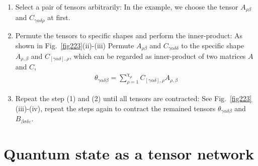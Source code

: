 \begin{enumerate}

	\item Select a pair of tensors arbitrarily: In the example, we choose the tensor $A_{\rho \beta}$ and $C_{\gamma \alpha \delta \rho}$ at first. 
	\item Permute the tensors to specific shapes and perform the inner-product: As shown in Fig.~\ref{fig223}(ii)-(iii) Permute $A_{\rho \beta}$ and $C_{\gamma \alpha \delta \delta}$ to the specific shape $A_{\rho, \beta}$ and $C_{[\gamma \alpha \delta], \rho}$, which can be regarded as inner-product of two matrices $A$ and $C$, 
		\begin{align}
			\theta_{\gamma \alpha \delta \beta} = \sum_{\rho = 1}^{\chi_{\rho}}{C_{[\gamma \alpha \delta], \rho} A_{\rho, \beta}}
		\end{align}
	\item Repeat the step (1) and (2) until all tensors are contracted: See Fig.~\ref{fig223}(iii)-(iv), repeat the steps again to contract the remained tensors $\theta_{\gamma \alpha \delta \beta}$ and $B_{\beta \sigma \delta \varepsilon}$.
\end{enumerate}

\section{Quantum state as a tensor network} %
\label{sub:map2quan}

